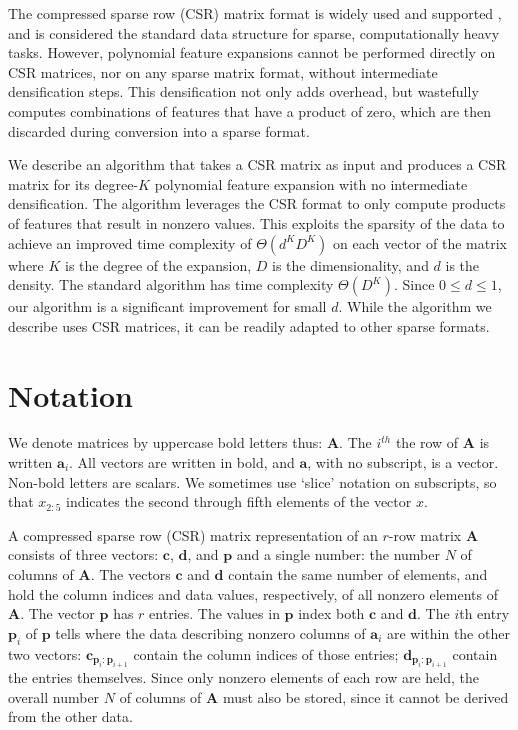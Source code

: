 \documentclass{article}
\begin{document}
The compressed sparse row (CSR) matrix format \cite{saad1994sparskit} is widely used \cite{liu2012sparse, bulucc2009parallel, bell2008efficient, white1997improving} and supported \cite{eigenweb, bastien2012theano, scikit-learn, koenker2003sparsem}, and is considered the standard data structure for sparse, computationally heavy tasks.
However, polynomial feature expansions cannot be performed directly on CSR matrices, nor on any sparse matrix format, without intermediate densification steps.
This densification not only adds overhead, but wastefully computes combinations of features that have a product of zero, which are then discarded during conversion into a sparse format.

We describe an algorithm that takes a CSR matrix as input and produces a CSR matrix for its degree-$K$ polynomial feature expansion with no intermediate densification.
The algorithm leverages the CSR format to only compute products of features that result in nonzero values.
This exploits the sparsity of the data to achieve an improved time complexity of $\Theta(d^KD^K)$ on each vector of the matrix where $K$ is the degree of the expansion, $D$ is the dimensionality, and $d$ is the density.
The standard algorithm has time complexity $\Theta(D^K)$.
Since $0 \le d \le 1$, our algorithm is a significant improvement for small $d$.
While the algorithm we describe uses CSR matrices, it can be readily adapted to other sparse formats.

\section{Notation}
We denote matrices by uppercase bold letters thus: $\bm{A}$. 
The $i^{th}$ the row of $\bm{A}$ is written $\bm{a}_i$. All vectors are written in bold, and  $\bm{a}$, with no subscript, is a vector. Non-bold letters are scalars. We sometimes use `slice' notation on subscripts, so that $x_{2:5}$ indicates the second through fifth elements of the vector $x$.

A compressed sparse row (CSR) matrix representation of an $r$-row matrix $\bm{A}$ consists of three vectors: $\bm{c}$, $\bm{d}$, and $\bm{p}$ and a single number: the number $N$ of columns of $\bm{A}$. The vectors
$\bm{c}$ and $\bm{d}$ contain the same number of elements, and hold the column indices and data values, respectively, of all nonzero elements of $\bm{A}$.
The vector $\bm{p}$ has $r$ entries. The values in $\bm{p}$ index both $\bm{c}$ and $\bm{d}$. The $i$th entry $\bm{p}_i$ of $\bm{p}$ tells where
the data describing nonzero columns of $\bm{a}_i$ are within the other two vectors: $\bm{c}_{\bm{p}_i:\bm{p}_{i+1}}$ contain the column indices of those entries; $\bm{d}_{\bm{p}_i:\bm{p}_{i+1}}$ contain the entries themselves.
Since only nonzero elements of each row are held, the overall number $N$ of columns of $\bm{A}$  must also be stored, since it cannot be derived
from the other data.
\end{document}
